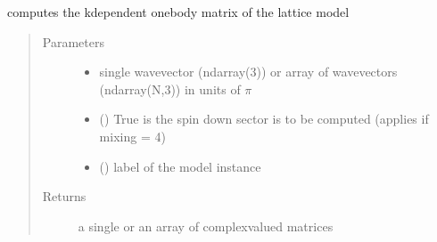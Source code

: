 \documentclass[letterpaper,10pt,english]{sphinxmanual}
\begin{document}
\begin{fulllineitems}
\label{\detokenize{functions:pyqcm.tk}}
\sphinxAtStartPar
computes the k\sphinxhyphen{}dependent one\sphinxhyphen{}body matrix of the lattice model
\begin{quote}\begin{description}
\item[{Parameters}] \leavevmode\begin{itemize}
\item {} 
\sphinxAtStartPar
{} \textendash{} single wavevector (ndarray(3)) or array of wavevectors (ndarray(N,3)) in units of \(\pi\)

\item {} 
\sphinxAtStartPar
{} () \textendash{} True is the spin down sector is to be computed (applies if mixing = 4)

\item {} 
\sphinxAtStartPar
{} () \textendash{} label of the model instance

\end{itemize}

\item[{Returns}] \leavevmode
\sphinxAtStartPar
a single or an array of complex\sphinxhyphen{}valued matrices

\end{description}\end{quote}

\end{fulllineitems}

\end{document}
